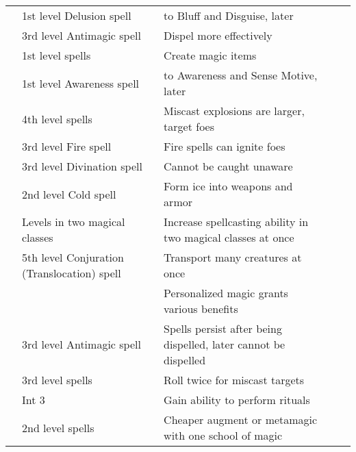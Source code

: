 \begin{longtabuwrapper}
\begin{longtabu}{>{\lcol}p{10em} >{\lcol}p{15em} >{\lcol}X >{\lcol}p{8em} >{\lcol}p{3em}}
         & 1st level Delusion spell &  to Bluff and Disguise, later  & \x &  \\
         & 3rd level Antimagic spell & Dispel more effectively & \x &  \\
         & 1st level spells & Create magic items & \x &  \\
         & 1st level Awareness spell &  to Awareness and Sense Motive, later  & \x &  \\
         & 4th level spells & Miscast explosions are larger, target foes & \x &  \\
         & 3rd level Fire spell & Fire spells can ignite foes & \x &  \\
         & 3rd level Divination spell & Cannot be caught unaware & \x &  \\
         & 2nd level Cold spell & Form ice into weapons and armor & \x &  \\
         & Levels in two magical classes & Increase spellcasting ability in two magical classes at once & \x &  \\
         & 5th level Conjuration (Translocation) spell & Transport many creatures at once & \x &  \\
         & \x & Personalized magic grants various benefits & \x &  \\
         & 3rd level Antimagic spell & Spells persist after being dispelled, later cannot be dispelled & \x &  \\
         & 3rd level spells & Roll twice for miscast targets & \x &  \\
         & Int 3 & Gain ability to perform rituals & \x &  \\
         & 2nd level spells & Cheaper augment or metamagic with one school of magic & \x &  \\

\end{longtabu}
\end{longtabuwrapper}
